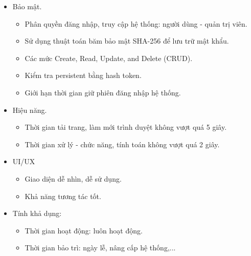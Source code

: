 \begin{itemize}
    \item Bảo mật.
    \begin{itemize}
        \item Phân quyền đăng nhập, truy cập hệ thống: người dùng - quản trị viên.
        \item Sử dụng thuật toán băm bảo mật SHA-256 để lưu trữ mật khẩu.
        \item Các mức Create, Read, Update, and Delete (CRUD).
        \item Kiểm tra persistent bằng hash token.
        \item Giới hạn thời gian giữ phiên đăng nhập hệ thống.
    \end{itemize}
    \item Hiệu năng.
    \begin{itemize}
        \item Thời gian tải trang, làm mới trình duyệt không vượt quá 5 giây.
        \item Thời gian xử lý - chức năng, tính toán không vượt quá 2 giây.
    \end{itemize}
    \item UI/UX
    \begin{itemize}
        \item Giao diện dễ nhìn, dễ sử dụng.
        \item Khả năng tương tác tốt.
    \end{itemize}
    \item Tính khả dụng:  
    \begin{itemize}
        \item Thời gian hoạt động: luôn hoạt động.
        \item Thời gian bảo trì: ngày lễ, nâng cấp hệ thống,...
    \end{itemize}
\end{itemize}